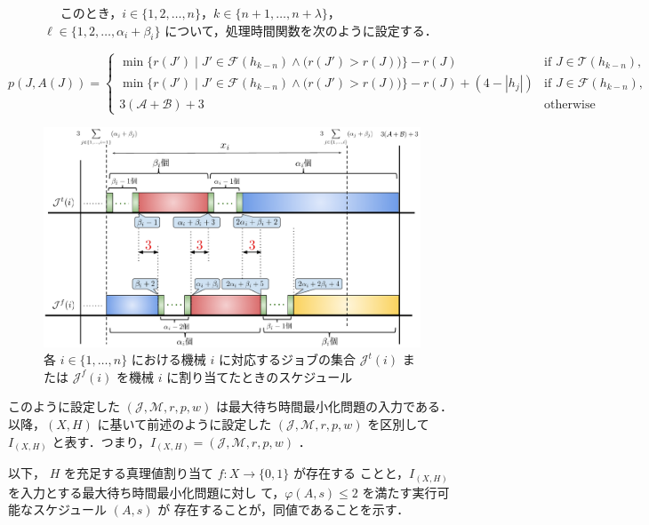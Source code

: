\documentclass[12pt]{optlab-bachelor}
\begin{document}
\begin{description}
  \item[] ~~ このとき，$i \in \{1,2,\ldots,n\}$，$k \in \{n + 1, \ldots , n + \lambda\}$，$\ell \in \{1,2,\ldots, \alpha_i + \beta_i\}$ について，処理時間関数を次のように設定する．
\end{description}
{\small
\begin{equation}
  p(J,A(J)) = \left\{ \begin{array}{lll} \min \bigg\{r(J') \mid
  J' \in \mathcal{F}(h_{k - n}) \wedge \big(r(J') > r(J) \big) \bigg\} - r(J)
  & \text{if } J \in \mathcal{T}(h_{k - n}), \\ \min \bigg\{r(J') \mid
  J' \in \mathcal{F}(h_{k - n}) \wedge \big(r(J') > r(J) \big) \bigg\} - r(J)
  + (4 - |h_j|) & \text{if } J \in \mathcal{F}(h_{k - n}), \\ 3(\mathcal{A} + \mathcal{B}) + 3 & \text{otherwise}\end{array} \right. \tag{B.1}
\end{equation}
}

\begin{figure}[h]
  \centering
  \includegraphics[width = 16cm]{figure/3SAT1.pdf}
  \caption{各 $i \in \{1,\ldots,n\}$ における機械 $i$ に対応するジョブの集合 $\mathcal{J}^t(i)$ または $\mathcal{J}^f(i)$ を機械 $i$ に割り当てたときのスケジュール}
\end{figure}

このように設定した $(\mathcal{J}, \mathcal{M}, r, p, w)$ は最大待ち時間最小化問題の入力である．以降，$(X,H)$ に基いて前述のように設定した $(\mathcal{J}, \mathcal{M}, r, p, w)$ を区別して $I_{(X,H)}$ と表す．つまり，$I_{(X,H)} = (\mathcal{J}, \mathcal{M}, r, p, w)$ ．

以下， $H$ を充足する真理値割り当て $f : X \to \{0,1\}$ が存在する
ことと，$I_{(X,H)}$ を入力とする最大待ち時間最小化問題に対し
て，$\varphi(A,s) \le 2$ を満たす実行可能なスケジュール $(A,s)$ が
存在することが，同値であることを示す．
\end{document}
